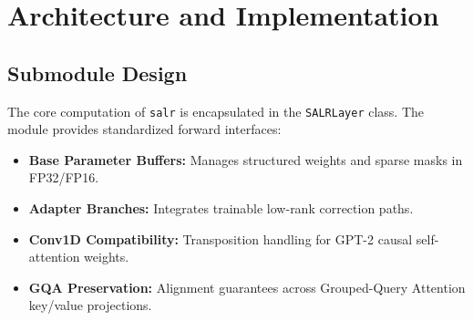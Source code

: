\section{Architecture and Implementation}

\subsection{Submodule Design}
The core computation of \texttt{salr} is encapsulated in the \texttt{SALRLayer} class. The module provides standardized forward interfaces:
\begin{itemize}
\item \textbf{Base Parameter Buffers:} Manages structured weights and sparse masks in FP32/FP16.
\item \textbf{Adapter Branches:} Integrates trainable low-rank correction paths.
\item \textbf{Conv1D Compatibility:} Transposition handling for GPT-2 causal self-attention weights.
\item \textbf{GQA Preservation:} Alignment guarantees across Grouped-Query Attention key/value projections.
\end{itemize}
